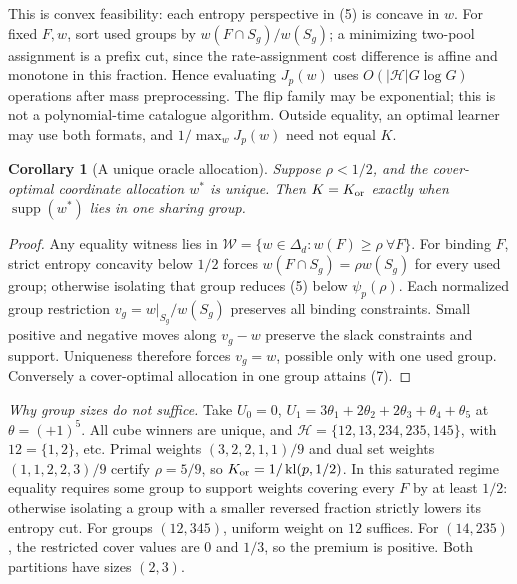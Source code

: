 \documentclass[sigconf,anonymous,review]{acmart}
\newtheorem{corollary}[theorem]{Corollary}
\DeclareMathOperator{\kl}{kl}
\begin{document}
This is convex feasibility: each entropy perspective in (5) is concave in $w$. For fixed $F,w$, sort used groups by $w(F\cap S_g)/w(S_g)$; a minimizing two-pool assignment is a prefix cut, since the rate-assignment cost difference is affine and monotone in this fraction. Hence evaluating $J_p(w)$ uses $O(|\mathcal H|G\log G)$ operations after mass preprocessing. The flip family may be exponential; this is not a polynomial-time catalogue algorithm. Outside equality, an optimal learner may use both formats, and $1/\max_w J_p(w)$ need not equal $K$.
\begin{corollary}[A unique oracle allocation] Suppose $\rho<1/2$, and the cover-optimal coordinate allocation $w^*$ is unique. Then $K=K_{\rm or}$ exactly when $\operatorname{supp}(w^*)$ lies in one sharing group.\end{corollary}
\begin{proof} Any equality witness lies in $\mathcal W=\{w\in\Delta_d:w(F)\ge\rho\ \forall F\}$. For binding $F$, strict entropy concavity below $1/2$ forces $w(F\cap S_g)=\rho w(S_g)$ for every used group; otherwise isolating that group reduces (5) below $\psi_p(\rho)$. Each normalized group restriction $v_g=w|_{S_g}/w(S_g)$ preserves all binding constraints. Small positive and negative moves along $v_g-w$ preserve the slack constraints and support. Uniqueness therefore forces $v_g=w$, possible only with one used group. Conversely a cover-optimal allocation in one group attains (7).\end{proof}
\emph{Why group sizes do not suffice.} Take $U_0=0$, $U_1=3\theta_1+2\theta_2+2\theta_3+\theta_4+\theta_5$ at $\theta=(+1)^5$. All cube winners are unique, and $\mathcal H=\{12,13,234,235,145\}$, with $12=\{1,2\}$, etc. Primal weights $(3,2,2,1,1)/9$ and dual set weights $(1,1,2,2,3)/9$ certify $\rho=5/9$, so $K_{\rm or}=1/\kl(p,1/2)$. In this saturated regime equality requires some group to support weights covering every $F$ by at least $1/2$: otherwise isolating a group with a smaller reversed fraction strictly lowers its entropy cut. For groups $(12,345)$, uniform weight on $12$ suffices. For $(14,235)$, the restricted cover values are $0$ and $1/3$, so the premium is positive. Both partitions have sizes $(2,3)$.
\end{document}
